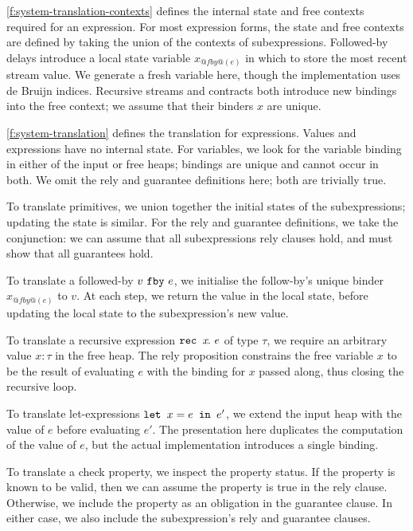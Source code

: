 

\autoref{f:system-translation-contexts} defines the internal state and free contexts required for an expression.
For most expression forms, the state and free contexts are defined by taking the union of the contexts of subexpressions.
Followed-by delays introduce a local state variable $x_{@fby@(e)}$ in which to store the most recent stream value.
We generate a fresh variable here, though the implementation uses de Bruijn indices.
Recursive streams and contracts both introduce new bindings into the free context; we assume that their binders $x$ are unique.

\autoref{f:system-translation} defines the translation for expressions.
Values and expressions have no internal state.
For variables, we look for the variable binding in either of the input or free heaps; bindings are unique and cannot occur in both.
We omit the rely and guarantee definitions here; both are trivially true.

To translate primitives, we union together the initial states of the subexpressions; updating the state is similar.
For the rely and guarantee definitions, we take the conjunction: we can assume that all subexpressions rely clauses hold, and must show that all guarantees hold.

To translate a followed-by $v~\texttt{fby}~e$, we initialise the follow-by's unique binder $x_{@fby@(e)}$ to $v$.
At each step, we return the value in the local state, before updating the local state to the subexpression's new value.

To translate a recursive expression $\texttt{rec~} x\hspace{-0.1em}.~e$ of type $\tau$, we require an arbitrary value $x: \tau$ in the free heap.
The rely proposition constrains the free variable $x$ to be the result of evaluating $e$ with the binding for $x$ passed along, thus closing the recursive loop.

To translate let-expressions $\texttt{let~} x = e \texttt{~in~} e'$, we extend the input heap with the value of $e$ before evaluating $e'$.
The presentation here duplicates the computation of the value of $e$, but the actual implementation introduces a single binding.

To translate a check property, we inspect the property status.
If the property is known to be valid, then we can assume the property is true in the rely clause.
Otherwise, we include the property as an obligation in the guarantee clause.
In either case, we also include the subexpression's rely and guarantee clauses.

